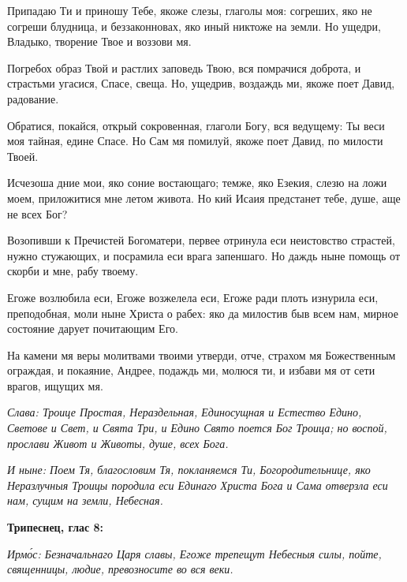 Припадаю Ти и приношу Тебе, якоже слезы, глаголы моя: согреших, яко не согреши блудница, и беззаконновах, яко иный никтоже на земли. Но ущедри, Владыко, творение Твое и воззови мя.

Погребох образ Твой и растлих заповедь Твою, вся помрачися доброта, и страстьми угасися, Спасе, свеща. Но, ущедрив, воздаждь ми, якоже поет Давид, радование.

Обратися, покайся, открый сокровенная, глаголи Богу, вся ведущему: Ты веси моя тайная, едине Спасе. Но Сам мя помилуй, якоже поет Давид, по милости Твоей.

Исчезоша дние мои, яко соние востающаго; темже, яко Езекия, слезю на ложи моем, приложитися мне летом живота. Но кий Исаия предстанет тебе, душе, аще не всех Бог?


Возопивши к Пречистей Богоматери, первее отринула еси неистовство страстей, нужно стужающих, и посрамила еси врага запеншаго. Но даждь ныне помощь от скорби и мне, рабу твоему.


Егоже возлюбила еси, Егоже возжелела еси, Егоже ради плоть изнурила еси, преподобная, моли ныне Христа о рабех: яко да милостив быв всем нам, мирное состояние дарует почитающим Его.


На камени мя веры молитвами твоими утверди, отче, страхом мя Божественным ограждая, и покаяние, Андрее, подаждь ми, молюся ти, и избави мя от сети врагов, ищущих мя.

\itshape Слава\normalfont{}: Троице Простая, Нераздельная, Единосущная и Естество Едино, Светове и Свет, и Свята Три, и Едино Свято поется Бог Троица; но воспой, прослави Живот и Животы, душе, всех Бога.

\itshape И ныне\normalfont{}: Поем Тя, благословим Тя, покланяемся Ти, Богородительнице, яко Неразлучныя Троицы породила еси Единаго Христа Бога и Сама отверзла еси нам, сущим на земли, Небесная. 

\medskip\bfseries Трипеснец, глас 8:

\normalfont{}


\itshape Ирм\'{о}с\normalfont{}: Безначальнаго Царя славы, Егоже трепещут Небесныя силы, пойте, священницы, людие, превозносите во вся веки.

